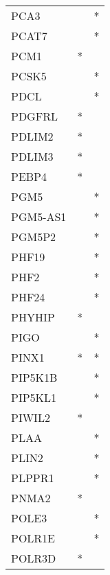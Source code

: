 \begin{longtable}{lcc}
PCA3                  &                &          * \\
PCAT7                 &                &          * \\
PCM1                  &              * &            \\
PCSK5                 &                &          * \\
PDCL                  &                &          * \\
PDGFRL                &              * &            \\
PDLIM2                &              * &            \\
PDLIM3                &              * &            \\
PEBP4                 &              * &            \\
PGM5                  &                &          * \\
PGM5-AS1              &                &          * \\
PGM5P2                &                &          * \\
PHF19                 &                &          * \\
PHF2                  &                &          * \\
PHF24                 &                &          * \\
PHYHIP                &              * &            \\
PIGO                  &                &          * \\
PINX1                 &              * &          * \\
PIP5K1B               &                &          * \\
PIP5KL1               &                &          * \\
PIWIL2                &              * &            \\
PLAA                  &                &          * \\
PLIN2                 &                &          * \\
PLPPR1                &                &          * \\
PNMA2                 &              * &            \\
POLE3                 &                &          * \\
POLR1E                &                &          * \\
POLR3D                &              * &            \\

\end{longtable}
